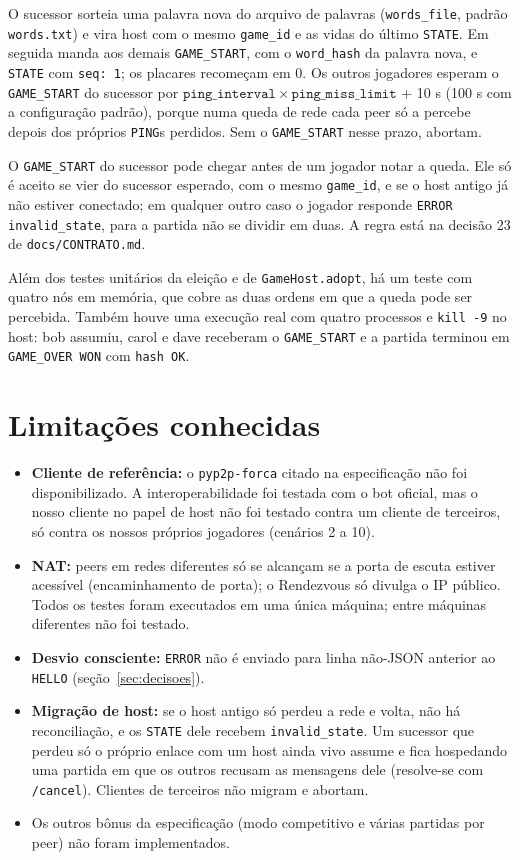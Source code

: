 \documentclass[11pt,a4paper]{article}
\begin{document}
O sucessor sorteia uma palavra nova do arquivo de palavras (\texttt{words\_file}, padrão \texttt{words.txt}) e vira host com o mesmo \texttt{game\_id} e as vidas do último \texttt{STATE}. Em seguida manda aos demais \texttt{GAME\_START}, com o \texttt{word\_hash} da palavra nova, e \texttt{STATE} com \texttt{seq: 1}; os placares recomeçam em 0. Os outros jogadores esperam o \texttt{GAME\_START} do sucessor por $\mathtt{ping\_interval} \times \mathtt{ping\_miss\_limit}$ + 10 s (100 s com a configuração padrão), porque numa queda de rede cada peer só a percebe depois dos próprios \texttt{PING}s perdidos. Sem o \texttt{GAME\_START} nesse prazo, abortam.

O \texttt{GAME\_START} do sucessor pode chegar antes de um jogador notar a queda. Ele só é aceito se vier do sucessor esperado, com o mesmo \texttt{game\_id}, e se o host antigo já não estiver conectado; em qualquer outro caso o jogador responde \texttt{ERROR invalid\_state}, para a partida não se dividir em duas. A regra está na decisão 23 de \texttt{docs/CONTRATO.md}.

Além dos testes unitários da eleição e de \texttt{GameHost.adopt}, há um teste com quatro nós em memória, que cobre as duas ordens em que a queda pode ser percebida. Também houve uma execução real com quatro processos e \texttt{kill -9} no host: bob assumiu, carol e dave receberam o \texttt{GAME\_START} e a partida terminou em \texttt{GAME\_OVER WON} com \texttt{hash OK}.

\section{Limitações conhecidas}
\begin{itemize}
\item \textbf{Cliente de referência:} o \texttt{pyp2p-forca} citado na especificação não foi disponibilizado. A interoperabilidade foi testada com o bot oficial, mas o nosso cliente no papel de host não foi testado contra um cliente de terceiros, só contra os nossos próprios jogadores (cenários 2 a 10).
\item \textbf{NAT:} peers em redes diferentes só se alcançam se a porta de escuta estiver acessível (encaminhamento de porta); o Rendezvous só divulga o IP público. Todos os testes foram executados em uma única máquina; entre máquinas diferentes não foi testado.
\item \textbf{Desvio consciente:} \texttt{ERROR} não é enviado para linha não-JSON anterior ao \texttt{HELLO} (seção~\ref{sec:decisoes}).
\item \textbf{Migração de host:} se o host antigo só perdeu a rede e volta, não há reconciliação, e os \texttt{STATE} dele recebem \texttt{invalid\_state}. Um sucessor que perdeu só o próprio enlace com um host ainda vivo assume e fica hospedando uma partida em que os outros recusam as mensagens dele (resolve-se com \texttt{/cancel}). Clientes de terceiros não migram e abortam.
\item Os outros bônus da especificação (modo competitivo e várias partidas por peer) não foram implementados.
\end{itemize}
\end{document}
